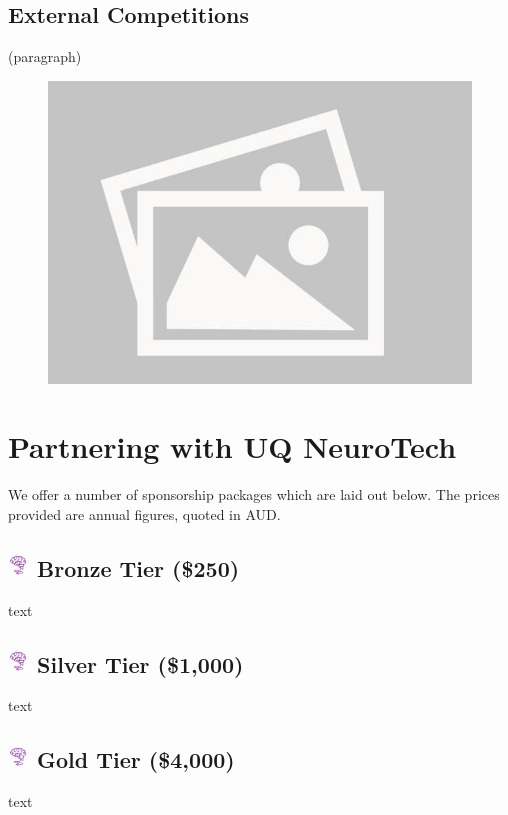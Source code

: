 \documentclass[a4paper,12pt]{report}
\begin{document}
\subsection*{External Competitions}
(paragraph)


\begin{figure}[H]
    \centering
    \includegraphics[width=0.65\linewidth]{./photos/placeholder.jpg}
\end{figure}

\newpage

\section*{Partnering with UQ NeuroTech}
\large
We offer a number of sponsorship packages which are laid out below. The prices provided are annual figures, quoted in AUD.
\normalsize

\subsection*{
    \includegraphics[width=1em]{./photos/logo.png}
    \textcolor{sponsor_bronze}{Bronze Tier (\$250)}
}
text
\subsection*{
    \includegraphics[width=1em]{./photos/logo.png}
    \textcolor{sponsor_silver}{Silver Tier (\$1,000)}
}
text


\subsection*{
    \includegraphics[width=1em]{./photos/logo.png}
    \textcolor{sponsor_gold}{Gold Tier (\$4,000)}
}
text
\end{document}
